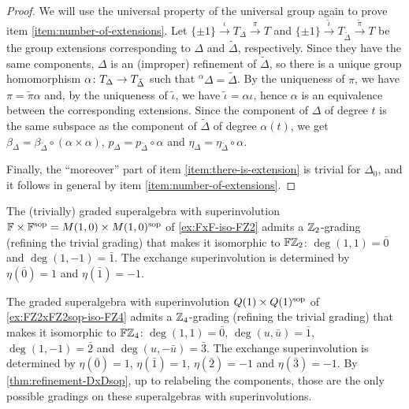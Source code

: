 \begin{proof}
	We will use the universal property of the universal group again to prove item \eqref{item:number-of-extensions}.
	Let $\{ \pm 1 \} \xrightarrow{\iota} T_\Delta \xrightarrow{\pi} T$ and $\{ \pm 1 \} \xrightarrow{\tilde\iota} T_{\tilde \Delta} \xrightarrow{\tilde\pi} T$ be the group extensions corresponding to $\Delta$ and $\tilde\Delta$, respectively. 
	Since they have the same components, $\Delta$ is an (improper) refinement of $\tilde\Delta$, so there is a unique group homomorphism $\alpha\colon T_\Delta \to T_{\tilde \Delta}$ such that ${}^\alpha \Delta = \tilde\Delta$. 
	By the uniqueness of $\pi$, we have $\pi = \tilde\pi \alpha$ and, by the uniqueness of $\tilde\iota$, we have $\tilde\iota = \alpha \iota$, hence $\alpha$ is an equivalence between the corresponding extensions. 
	Since the component of $\Delta$ of degree $t$ is the same subspace as the component of $\tilde\Delta$ of degree $\alpha(t)$, we get $\beta_\Delta = \beta_{\tilde\Delta} \circ (\alpha \times \alpha)$, $p_\Delta = p_{\tilde\Delta} \circ \alpha$ and $\eta_\Delta = \eta_{\tilde\Delta} \circ \alpha$. 
	
	Finally, the ``moreover'' part of item \eqref{item:there-is-extension} is trivial for $\Delta_0$, and it follows in general by item \eqref{item:number-of-extensions}.
\end{proof}

\begin{ex}\label{ex:now-FZ2-is-division}
    The (trivially) graded superalgebra with superinvolution $\mathbb{F} \times \mathbb{F}^{\mathrm{sop}} = M(1,0) \times M(1,0)^{\mathrm{sop}}$ of \cref{ex:FxF-iso-FZ2} admits a $\mathbb{Z}_2$-grading (refining the trivial grading) that makes it isomorphic to $\mathbb{F}\mathbb{Z}_2$: $\deg (1, 1) = \bar 0$ and $\deg (1, -1) = \bar 1$. 
    The exchange superinvolution is determined by $\eta(\bar 0) = 1$ and $\eta(\bar 1) = -1$. 
\end{ex}

\begin{ex}\label{ex:now-FZ4-is-division}
    The graded superalgebra with superinvolution $Q(1) \times Q(1)^{\mathrm{sop}}$ of \cref{ex:FZ2xFZ2sop-iso-FZ4} 
    admits a $\mathbb{Z}_4$-grading (refining the trivial grading) that makes it isomorphic to $\mathbb{F}\mathbb{Z}_4$: $\deg (1,1) = \bar 0$, 
    $\deg (u, \bar u) = \bar 1$, 
    $\deg (1,-1) = \bar 2$ and 
    $\deg (u,- \bar u) = \bar 3$. 
    The exchange superinvolution is determined by $\eta(\bar 0) = 1$, $\eta(\bar 1) = 1$, $\eta(\bar 2) = -1$ and $\eta(\bar 3) = -1$. 
    By \cref{thm:refinement-DxDsop}, up to relabeling the components, those are the only possible gradings on these superalgebras with superinvolutions. 
\end{ex}

